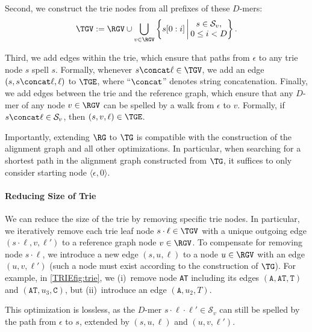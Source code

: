 Second, we construct the trie nodes from all prefixes of these $D$-mers:
%
$$ \TGV:= \RGV \cup
\bigcup_{v \in \RGV} \left\{s[0:i] \,\middle|\, \begin{array}{{@{}c@{}}}
	s \in \mathcal{S}_v, \\
	0 \leq i < D
\end{array} \right\}.
$$

Third, we add edges within the trie, which ensure that paths from $\epsilon$ to
any trie node $s$ spell $s$. Formally, whenever $s \concat \ell \in \TGV$, we add
an edge $(s,s \concat \ell, \ell)$ to $\TGE$, where ``$\concat$'' denotes string
concatenation.
%
Finally, we add edges between the trie and the reference graph, which ensure
that any $D$-mer of any node $v \in \RGV$ can be spelled by a walk from
$\epsilon$ to $v$. Formally, if $s \concat \ell \in \mathcal{S}_v$, then
$(s,v,\ell) \in \TGE$.

Importantly, extending $\RG$ to $\TG$ is compatible with the construction of the alignment graph and all other
optimizations. In particular, when searching for a shortest path in the
alignment graph constructed from $\TG$, it suffices to only consider starting
node $\langle \epsilon, 0 \rangle$.

\paragraph{Reducing Size of Trie} \label{TRIEpara:reducing_trie}
We can reduce the size of the trie by removing specific trie nodes.
%
In particular, we iteratively remove each trie leaf node $s \cdot \ell \in \TGV$ with a unique outgoing edge $(s \cdot \ell, v, \ell')$ to a reference graph node $v \in \RGV$.
%
To compensate for removing node $s \cdot \ell$, we introduce a new edge $(s, u, \ell)$ to a node $u \in \RGV$ with an edge $(u,v,\ell')$ (such a node must exist according to the construction of $\TG$).
%
For example, in \cref{TRIEfig:trie}, we (i)~remove node \texttt{AT} including its edges $(\texttt{A},\texttt{AT},\texttt{T})$ and $(\texttt{AT},u_3,\texttt{C})$, but (ii)~introduce an edge $(\texttt{A},u_2,T)$.

This optimization is lossless, as the $D$-mer $s \cdot \ell \cdot \ell' \in \mathcal{S}_v$ can still be spelled by the path from $\epsilon$ to $s$, extended by $(s, u, \ell)$ and $(u, v, \ell')$.